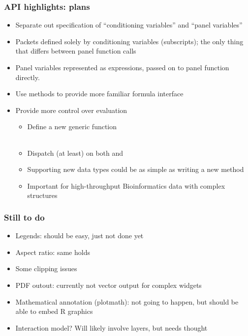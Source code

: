 \documentclass[compress]{beamer}
\begin{document}
\begin{frame}
  \frametitle{API highlights: plans}
  \begin{itemize}
  \item Separate out specification of ``conditioning variables'' and
    ``panel variables''
  \item Packets defined solely by conditioning variables
    (subscripts); the only thing that differs between panel function
    calls
  \item Panel variables represented as expressions, passed on to
    panel function directly.
  \item Use methods to provide more familiar formula interface
  \item Provide more control over evaluation
    \begin{itemize}
    \item Define a new generic function \\
      ~~~
    \item Dispatch (at least) on both  and 
    \item Supporting new data types could be as simple as writing a new method
    \item Important for high-throughput Bioinformatics data with complex structures
    \end{itemize}
  \end{itemize}
\end{frame}

\begin{frame}
  \frametitle{Still to do}
  \begin{itemize}
  \item Legends: should be easy, just not done yet
  \item Aspect ratio: same holds
  \item Some clipping issues
  \item PDF outout: currently not vector output for complex widgets
  \item Mathematical annotation (plotmath): not going to happen, but
    should be able to embed R graphics
  \item Interaction model? Will likely involve layers, but needs thought
  \end{itemize}
\end{frame}
\end{document}
